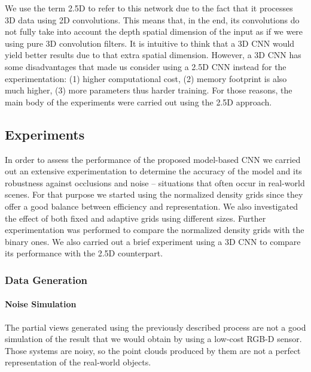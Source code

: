 We use the term \acs{2.5D} to refer to this network due to the fact that it processes \acs{3D} data using \acs{2D} convolutions. This means that, in the end, its convolutions do not fully take into account the depth spatial dimension of the input as if we were using pure \acs{3D} convolution filters. It is intuitive to think that a \acs{3D} \acs{CNN} would yield better results due to that extra spatial dimension. However, a \acs{3D} \acs{CNN} has some disadvantages that made us consider using a \acs{2.5D} \acs{CNN} instead for the experimentation: (1) higher computational cost, (2) memory footprint is also much higher, (3) more parameters thus harder training. For those reasons, the main body of the experiments were carried out using the \acs{2.5D} approach.

\subsection{Experiments}
\label{cha:objrecog:sec:study:subsec:experiments}

In order to assess the performance of the proposed model-based \acs{CNN} we carried out an extensive experimentation to determine the accuracy of the model and its robustness against occlusions and noise -- situations that often occur in real-world scenes. For that purpose we started using the normalized density grids since they offer a good balance between efficiency and representation. We also investigated the effect of both fixed and adaptive grids using different sizes. Further experimentation was performed to compare the normalized density grids with the binary ones. We also carried out a brief experiment using a \acs{3D} \acs{CNN} to compare its performance with the \acs{2.5D} counterpart.

\subsubsection{Data Generation}
\label{cha:objrecog:sec:study:subsec:experiments:subsubsec:data}

\paragraph{Noise Simulation}

The partial views generated using the previously described process are not a good simulation of the result that we would obtain by using a low-cost \acs{RGB-D} sensor. Those systems are noisy, so the point clouds produced by them are not a perfect representation of the real-world objects.

